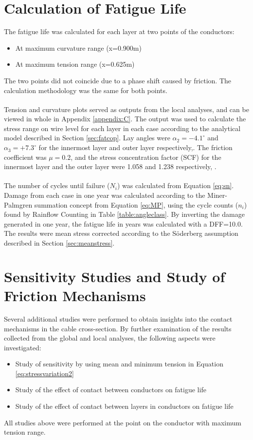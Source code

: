 \section{Calculation of Fatigue Life}
\label{sec:fatiguelife}
 The fatigue life was calculated for each layer at two points of the conductors: 
\begin{itemize}
\item At maximum curvature range (x=0.900m)
\item At maximum tension range  (x=0.625m)
\end{itemize}
The two points did not coincide due to a phase shift caused by friction. The calculation methodology was the same for both points.  \\\\ Tension and curvature plots served as outputs from the local analyses, and can be viewed in whole in Appendix \ref{appendix:C}. The output was used to calculate the stress range on wire level for each layer in each case according to the analytical model described in Section \ref{sec:fatcop}. Lay angles were $\alpha_2=-4.1^\circ$ and $\alpha_3=+7.3^\circ$ for the innermost layer and outer layer respectively,\cite{Nasution2013}. The friction coefficient was  $\mu=0.2$, and the stress concentration factor (SCF) for the innermost layer and the outer layer were 1.058 and 1.238 respectively, \cite{NASUTION2014}.\\\\
The number of cycles until failure ($N_i$) was calculated from Equation \ref{eq:sn}. Damage from each case in one year was calculated according to the Miner-Palmgren summation concept from Equation \ref{eq:MP}, using the cycle counts ($n_i$) found by Rainflow Counting in Table \ref{table:angleclass}. By inverting the damage generated in one year, the fatigue life in years was calculated with a DFF=10.0. The results were mean stress corrected according to the Söderberg assumption described in Section \ref{sec:meanstress}. 

\section{Sensitivity Studies and Study of Friction Mechanisms}
Several additional studies were performed to obtain insights into the contact mechanisms in the cable cross-section. By further examination of the results collected from the global and local analyses, the following aspects were investigated:
\begin{itemize}
    \item Study of sensitivity by using mean and minimum tension in Equation \ref{eq:stressvariation2}
    \item Study of the effect of contact between conductors on fatigue life
    \item Study of the effect of contact between layers in conductors on fatigue life
\end{itemize}
All studies above were performed at the point on the conductor with maximum tension range.
